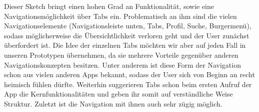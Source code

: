 Dieser Sketch bringt einen hohen Grad an Funktionalität, sowie eine Navigationsmöglichkeit über Tabs ein. Problematisch an ihm sind die vielen Navigationselemente (Navigationsleiste unten, Tabs, Profil, Suche, Burgermenü), sodass möglicherweise die Übersichtlichkeit verloren geht und der User zunächst überfordert ist. Die Idee der einzelnen Tabs möchten wir aber auf jeden Fall in unseren Prototypen übernehmen, da sie mehrere Vorteile gegenüber anderen Navigationskonzepten besitzen. Unter anderem ist diese Form der Navigation schon aus vielen anderen Apps bekannt, sodass der User sich von Beginn an recht heimisch fühlen dürfte. Weiterhin suggerieren Tabs schon beim ersten Aufruf der App die Kernfunktionalitäten und geben ihr somit auf verständliche Weise Struktur. Zuletzt ist die Navigation mit ihnen auch sehr zügig möglich.
